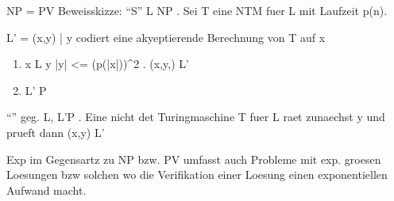 \begin{satz}
  NP = PV
  Beweisskizze:
  ``S'' L \in NP . Sei T eine NTM fuer L mit Laufzeit p(n).

  L' = {(x,y) | y codiert eine akyeptierende Berechnung von T auf x}

  \begin{enumerate}
  \item x \in L \Leftrightarrow  \E y |y| <= (p(|x|))^2 . (x,y,) \in L'

  \item L' \in P

  \end{enumerate}


``\supseteq'' geg. L, L'\in P . Eine nicht det Turingmaschine T fuer L raet zunaechst y und prueft dann (x,y) \in L'
  
\end{satz}

Exp im Gegensartz zu NP bzw. PV umfasst auch Probleme mit exp. groesen Loesungen bzw solchen wo die Verifikation einer Loesung einen exponentiellen Aufwand macht.


